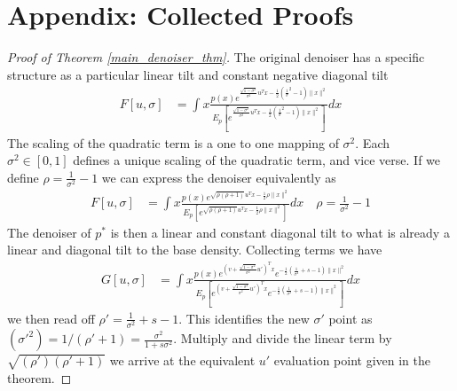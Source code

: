 \documentclass[11pt]{article}
\theoremstyle{proposition}
\theoremstyle{lemma}
\theoremstyle{corollary}
\theoremstyle{theorem}
\theoremstyle{definition}
\begin{document}
\section{Appendix: Collected Proofs}
\begin{proof}[Proof of Theorem \ref{main_denoiser_thm}]

The original denoiser has a specific structure as a particular linear tilt and constant negative diagonal tilt
\begin{align*}
 F[u,\sigma]&=\int x  \frac{p(x)e^{\frac{\sqrt{1-\sigma^{2}}}{\sigma^{2}}u^{T}x- \frac{1}{2}(\frac{1}{\sigma}^{2}-1)\|x\|^{2}}}{E_{p}[e^{\frac{\sqrt{1-\sigma^{2}}}{\sigma^{2}}u^{T}x- \frac{1}{2}(\frac{1}{\sigma}^{2}-1)\|x\|^{2}}]}dx
\end{align*}
The scaling of the quadratic term is a one to one mapping of $\sigma^{2}$. Each $\sigma^{2} \in [0,1]$ defines a unique scaling of the quadratic term, and vice verse. If we define $\rho = \frac{1}{\sigma^{2}}-1$ we can express the denoiser equivalently as
\begin{align*}
F[u,\sigma]&= \int x \frac{p(x)e^{\sqrt{\rho(\rho+1)}u^{T}x-\frac{1}{2}\rho\|x\|^{2}}}{E_{p}[e^{\sqrt{\rho(\rho+1)}u^{T}x-\frac{1}{2}\rho\|x\|^{2}}]}dx\quad \rho = \frac{1}{\sigma^{2}}-1
\end{align*}
The denoiser of $p^{*}$ is then a linear and constant diagonal tilt to what is already a linear and diagonal tilt to the base density. Collecting terms we have 
\begin{align*}
G[u, \sigma]&= \int x\frac{p(x)e^{(v+ \frac{\sqrt{1-\sigma^{2}}}{\sigma^{2}}u')^{T}x}e^{-\frac{1}{2}(\frac{1}{\sigma^{2}}+s-1)\|x\|^{2}}}{E_{p}[e^{(v+ \frac{\sqrt{1-\sigma^{2}}}{\sigma^{2}}u')^{T}x}e^{-\frac{1}{2}(\frac{1}{\sigma^{2}}+s-1)\|x\|^{2}}]}dx
\end{align*}
we then read off $\rho' = \frac{1}{\sigma^{2}}+s-1$. This identifies the new $\sigma'$ point as $(\sigma'^{2}) = 1/(\rho'+1) =\frac{\sigma^{2}}{1+s\sigma^{2}}$. Multiply and divide the linear term by $\sqrt{(\rho')(\rho'+1)}$ we arrive at the equivalent $u'$ evaluation point given in the theorem.
\end{proof}
\end{document}
